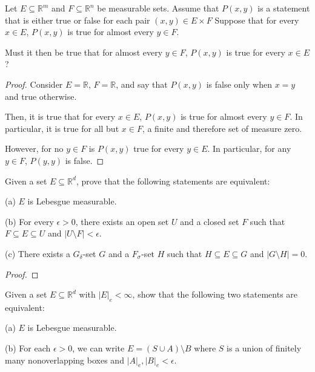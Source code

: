 \documentclass[10pt]{article}
\newenvironment{problem}[2][Problem]{\begin{trivlist}
\item[\hskip \labelsep {\bfseries #1}\hskip \labelsep {\bfseries #2.}]}{\end{trivlist}}
\begin{document}
\begin{problem}{2.2.36}
Let $E \subseteq \mathbb{R}^m$ and $F \subseteq \mathbb{R}^n$ be measurable sets. Assume that $P(x,y)$ is a statement that is either true or false for each pair $(x,y) \in E \times F$ Suppose that for every $x \in E$, $P(x,y)$ is true for almost every $y \in F$.

Must it then be true that for almost every $y \in F$, $P(x,y)$ is true for every $x \in E$?
\end{problem}

\begin{proof}[Proof]
Consider $E = \mathbb{R}$, $F = \mathbb{R}$, and say that $P(x,y)$ is false only when $x = y$ and true otherwise.

Then, it is true that for every $ x \in E$, $P(x,y)$ is true for almost every $y \in F$. In particular, it is true for all but $x \in F$, a finite and therefore set of measure zero.

However, for no $y\in F$ is $P(x,y)$ true for every $y \in E$. In particular, for any $y \in F$, $P(y,y)$ is false.
\end{proof}

\begin{problem}{2.2.37}
Given a set $E \subseteq \mathbb{R}^d$, prove that the following statements are equivalent:

(a) $E$ is Lebesgue measurable.

(b) For every $\epsilon > 0$, there exists an open set $U$ and a closed set $F$ such that $F \subseteq E \subseteq U$ and $|U \setminus F| < \epsilon$.

(c) There exists a $G_\delta$-set $G$ and a $F_\sigma$-set $H$ such that $H \subseteq E \subseteq G$ and $ |G \setminus H| = 0$.
\end{problem}

\begin{proof}[Proof]

\end{proof}

\begin{problem}{2.2.38}
Given a set $E \subseteq \mathbb{R}^d$ with $|E|_e < \infty$, show that the following two statements are equivalent:

(a) $E$ is Lebesgue measurable.

(b) For each $\epsilon > 0$, we can write $E = (S\cup A) \setminus B$ where $S$ is a union of finitely many nonoverlapping boxes and $|A|_e,|B|_e < \epsilon$.
\end{problem}
\end{document}
